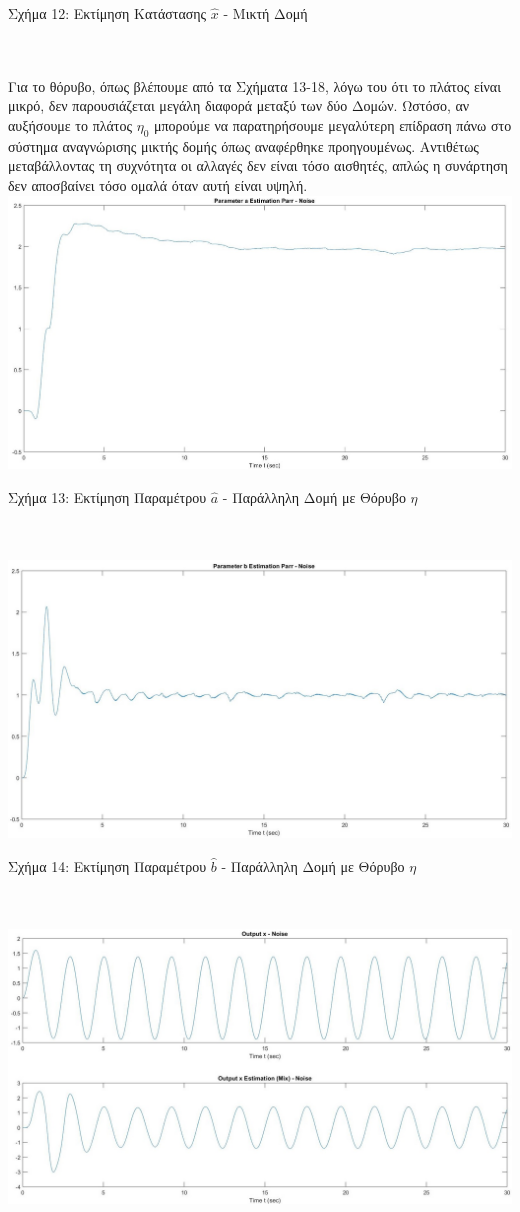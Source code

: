 \documentclass[12pt]{article}
\begin{document}
\centerline{Σχήμα 12: Εκτίμηση Κατάστασης $\hat{x}$ - Μικτή Δομή}
\\ \\
Για το θόρυβο, όπως βλέπουμε από τα Σχήματα 13-18, λόγω του ότι το πλάτος είναι μικρό, δεν παρουσιάζεται μεγάλη διαφορά μεταξύ των δύο Δομών. Ωστόσο, αν αυξήσουμε το πλάτος $\eta_0$ μπορούμε να παρατηρήσουμε μεγαλύτερη επίδραση πάνω στο σύστημα αναγνώρισης μικτής δομής όπως αναφέρθηκε προηγουμένως. Αντιθέτως μεταβάλλοντας τη συχνότητα οι αλλαγές δεν είναι τόσο αισθητές, απλώς η συνάρτηση δεν αποσβαίνει  τόσο ομαλά όταν αυτή είναι υψηλή.
\\
\includegraphics[width=\linewidth]{a_estim_par_Noise_2.jpg}
\centerline{Σχήμα 13: Εκτίμηση Παραμέτρου $\hat{a}$ - Παράλληλη Δομή με Θόρυβο $\eta$}
\\ \\
\includegraphics[width=\linewidth]{b_estim_par_Noise_2.jpg}
\centerline{Σχήμα 14: Εκτίμηση Παραμέτρου $\hat{b}$ - Παράλληλη Δομή με Θόρυβο $\eta$}
\\ \\
\includegraphics[width=\linewidth]{x_estim_par_Noise_2.jpg}
\end{document}
